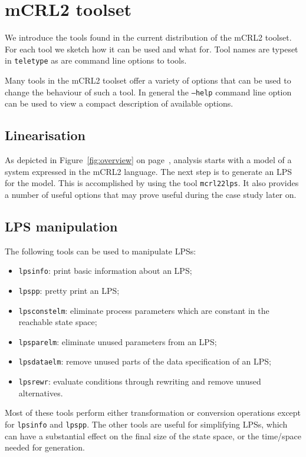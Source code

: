 \documentclass[a4paper,fleqn]{article}
\begin{document}
\section{mCRL2 toolset}
\label{sec:toolset}
  
We introduce the tools found in the current distribution of the mCRL2 toolset.
For each tool we sketch how it can be used and what for.  Tool names are
typeset in \texttt{teletype} as are command line options to tools.

Many tools in the mCRL2 toolset offer a variety of options that can be used
to change the behaviour of such a tool. In general the \texttt{--help} command
line option can be used to view a compact description of available options.

\subsection{Linearisation}

As depicted in Figure~\ref{fig:overview} on page~\pageref{fig:overview},
analysis starts with a model of a system expressed in the mCRL2 language.
The next step is to generate an LPS for the model. This is accomplished by
using the tool \texttt{mcrl22lps}. It also provides a number of useful options
that may prove useful during the case study later on.
 

\subsection{LPS manipulation}

The following tools can be used to manipulate LPSs:
\begin{itemize} 
\item \texttt{lpsinfo}: print basic information about an LPS;
\item \texttt{lpspp}: pretty print an LPS;
\item \texttt{lpsconstelm}: eliminate process parameters which are constant in the reachable state space;
\item \texttt{lpsparelm}: eliminate unused parameters from an LPS;
\item \texttt{lpsdataelm}: remove unused parts of the data specification of an LPS;
\item \texttt{lpsrewr}: evaluate conditions through rewriting and remove unused alternatives.
\end{itemize} 
Most of these tools perform either transformation or conversion operations
except for \texttt{lpsinfo} and \texttt{lpspp}. The other tools are useful
for simplifying LPSs, which can have a substantial effect on the final size
of the state space, or the time/space needed for generation.
 
\end{document}
